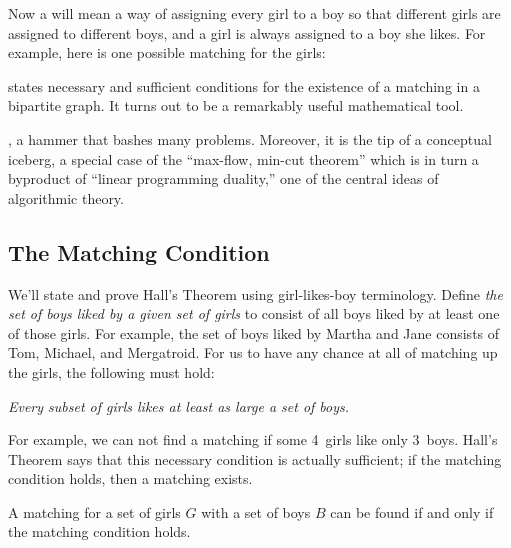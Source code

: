 
Now a  will mean a way of assigning every girl to a boy so
that different girls are assigned to different boys, and a girl is always
assigned to a boy she likes.  For example, here is one possible matching
for the girls:


 states necessary and sufficient conditions
for the existence of a matching in a bipartite graph.  It turns out to be
a remarkably useful mathematical tool.

\begin{solution}
, a hammer that bashes
many problems.  Moreover, it is the tip of a conceptual iceberg, a special
case of the ``max-flow, min-cut theorem'' which is in turn a byproduct of
``linear programming duality,'' one of the central ideas of algorithmic
theory.
\end{solution}

\subsection{The Matching Condition}

We'll state and prove Hall's Theorem using girl-likes-boy terminology.
Define \emph{the set of boys liked by a given set of girls} to consist of
all boys liked by at least one of those girls.  For example, the set of
boys liked by Martha and Jane consists of Tom, Michael, and Mergatroid.
For us to have any chance at all of matching up the girls, the following
 must hold:

\bigskip
\begin{center}
\emph{Every subset of girls likes at least as large a set of boys.}
\end{center}
\bigskip

For example, we can not find a matching if some 4~girls like only 3~boys.
Hall's Theorem says that this necessary condition is actually sufficient;
if the matching condition holds, then a matching exists.

\begin{theorem}
A matching for a set of girls $G$ with a set of boys $B$ can be found if
and only if the matching condition holds.
\end{theorem}

